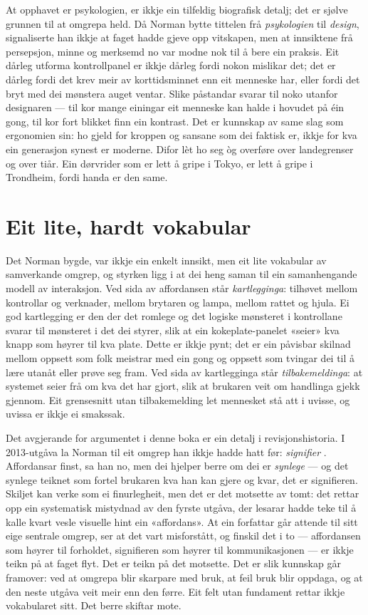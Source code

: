 At opphavet er psykologien, er ikkje ein tilfeldig biografisk detalj; det er sjølve grunnen til at omgrepa held. Då Norman bytte tittelen frå \emph{psykologien} til \emph{design}, signaliserte han ikkje at faget hadde gjeve opp vitskapen, men at innsiktene frå persepsjon, minne og merksemd no var modne nok til å bere ein praksis. Eit dårleg utforma kontrollpanel er ikkje dårleg fordi nokon mislikar det; det er dårleg fordi det krev meir av korttidsminnet enn eit menneske har, eller fordi det bryt med dei mønstera auget ventar. Slike påstandar svarar til noko utanfor designaren — til kor mange einingar eit menneske kan halde i hovudet på éin gong, til kor fort blikket finn ein kontrast. Det er kunnskap av same slag som ergonomien sin: ho gjeld for kroppen og sansane som dei faktisk er, ikkje for kva ein generasjon synest er moderne. Difor lèt ho seg òg overføre over landegrenser og over tiår. Ein dørvrider som er lett å gripe i Tokyo, er lett å gripe i Trondheim, fordi handa er den same.

\section{Eit lite, hardt vokabular}

Det Norman bygde, var ikkje ein enkelt innsikt, men eit lite vokabular av samverkande omgrep, og styrken ligg i at dei heng saman til ein samanhengande modell av interaksjon. Ved sida av affordansen står \emph{kartlegginga}: tilhøvet mellom kontrollar og verknader, mellom brytaren og lampa, mellom rattet og hjula. Ei god kartlegging er den der det romlege og det logiske mønsteret i kontrollane svarar til mønsteret i det dei styrer, slik at ein kokeplate-panelet «seier» kva knapp som høyrer til kva plate. Dette er ikkje pynt; det er ein påvisbar skilnad mellom oppsett som folk meistrar med ein gong og oppsett som tvingar dei til å lære utanåt eller prøve seg fram. Ved sida av kartlegginga står \emph{tilbakemeldinga}: at systemet seier frå om kva det har gjort, slik at brukaren veit om handlinga gjekk gjennom. Eit grensesnitt utan tilbakemelding let mennesket stå att i uvisse, og uvissa er ikkje ei smakssak.

Det avgjerande for argumentet i denne boka er ein detalj i revisjonshistoria. I 2013-utgåva la Norman til eit omgrep han ikkje hadde hatt før: \emph{signifier} \autocite{norman2013}. Affordansar finst, sa han no, men dei hjelper berre om dei er \emph{synlege} — og det synlege teiknet som fortel brukaren kva han kan gjere og kvar, det er signifieren. Skiljet kan verke som ei finurlegheit, men det er det motsette av tomt: det rettar opp ein systematisk mistydnad av den fyrste utgåva, der lesarar hadde teke til å kalle kvart vesle visuelle hint ein «affordans». At ein forfattar går attende til sitt eige sentrale omgrep, ser at det vart misforstått, og finskil det i to — affordansen som høyrer til forholdet, signifieren som høyrer til kommunikasjonen — er ikkje teikn på at faget flyt. Det er teikn på det motsette. Det er slik kunnskap går framover: ved at omgrepa blir skarpare med bruk, at feil bruk blir oppdaga, og at den neste utgåva veit meir enn den førre. Eit felt utan fundament rettar ikkje vokabularet sitt. Det berre skiftar mote.

